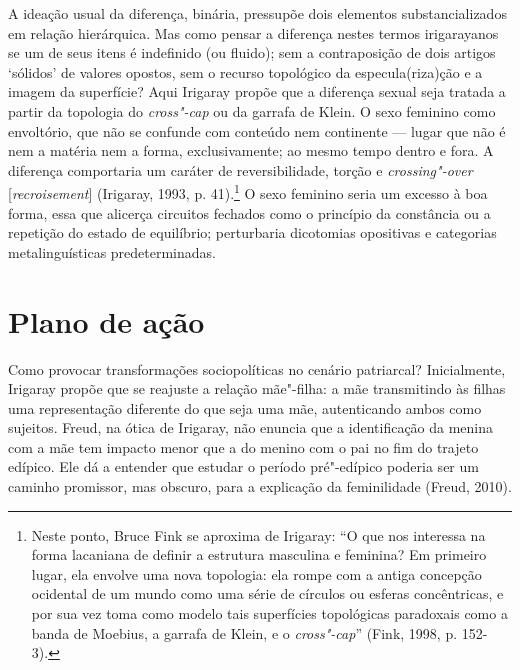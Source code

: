 A ideação usual da diferença, binária, pressupõe dois elementos
substancializados em relação hierárquica. Mas como pensar a diferença
nestes termos irigarayanos se um de seus itens é indefinido (ou fluido);
sem a contraposição de dois artigos `sólidos' de valores opostos, sem o
recurso topológico da especula(riza)ção e a imagem da superfície? Aqui
Irigaray propõe que a diferença sexual seja tratada a partir da
topologia do \emph{cross"-cap} ou da garrafa de Klein. O sexo feminino
como envoltório, que não se confunde com conteúdo nem continente ---
lugar que não é nem a matéria nem a forma, exclusivamente; ao mesmo
tempo dentro e fora. A diferença comportaria um caráter de
reversibilidade, torção e \emph{crossing"-over} {[}\emph{recroisement}{]}
(Irigaray, 1993, p. 41).\footnote{Neste ponto, Bruce Fink se
  aproxima de Irigaray: ``O que nos interessa na forma lacaniana de
  definir a estrutura masculina e feminina? Em primeiro lugar, ela
  envolve uma nova topologia: ela rompe com a antiga concepção ocidental
  de um mundo como uma série de círculos ou esferas concêntricas, e por
  sua vez toma como modelo tais superfícies topológicas paradoxais como
  a banda de Moebius, a garrafa de Klein, e o \emph{cross"-cap}'' (Fink,
  1998, p. 152-3).} O sexo feminino seria um excesso à boa forma, essa
que alicerça circuitos fechados como o princípio da constância ou a
repetição do estado de equilíbrio; perturbaria dicotomias opositivas e
categorias metalinguísticas predeterminadas.

\section{Plano de ação}

Como provocar transformações sociopolíticas no cenário patriarcal?
Inicialmente, Irigaray propõe que se reajuste a relação mãe"-filha: a mãe
transmitindo às filhas uma representação diferente do que seja uma mãe,
autenticando ambos como sujeitos. Freud, na ótica de Irigaray, não
enuncia que a identificação da menina com a mãe tem impacto menor que a
do menino com o pai no fim do trajeto edípico. Ele dá a entender que
estudar o período pré"-edípico poderia ser um caminho promissor, mas
obscuro, para a explicação da feminilidade (Freud, 2010).

